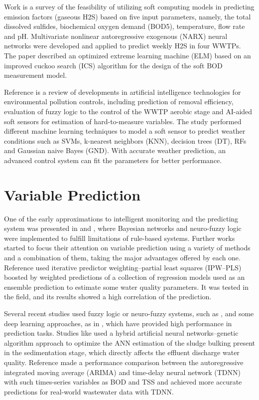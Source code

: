 Work \cite{Zounemat-Kermani2019} is a survey of the feasibility of utilizing soft computing models in predicting emission factors (gaseous H2S) based on five input parameters, namely, the total dissolved sulfides, biochemical oxygen demand (BOD5), temperature, flow rate and pH. Multivariate nonlinear autoregressive exogenous (NARX) neural networks were developed and applied to predict weekly H2S in four WWTPs. The paper \cite{Yu2019} described an optimized extreme learning machine (ELM) based on an improved cuckoo search (ICS) algorithm for the design of the soft BOD measurement model.

Reference \cite{Ye2020} is a review of developments in artificial intelligence technologies for environmental pollution controls, including prediction of removal efficiency, evaluation of fuzzy logic to the control of the WWTP aerobic stage and AI-aided soft sensors for estimation of hard-to-measure variables. 
The study \cite{Hernandez-del-Olmo2019} performed different machine learning techniques to model a soft sensor to predict weather conditions such as SVMs, k-nearest neighbors (KNN), decision trees (DT), RFs and Gaussian naive Bayes (GND). With accurate weather prediction, an advanced control system can fit the parameters for better performance.

\section{Variable Prediction}
\label{s:RelatedWorks-variablePrediction}

One of the early approximations to intelligent monitoring and the predicting system was presented in \cite{Sanguesa2000} and \cite{Haggege2005}, where Bayesian networks and neuro-fuzzy logic were implemented to fulfill limitations of rule-based systems. Further works started to focus their attention on variable prediction using a variety of methods and a combination of them, taking the major advantages offered by each one. Reference \cite{Qin2012} used iterative predictor weighting–partial least squares (IPW–PLS) boosted by weighted predictions of a collection of regression models used as an ensemble prediction to estimate some water quality parameters. It was tested in the field, and its results showed a high correlation of the prediction. 

Several recent studies used fuzzy logic or neuro-fuzzy systems, such as \cite{Nourani2018,Nadiri2018,Han2018}, and some deep learning approaches, as in \cite{Guo2015,Alsina2018,Dairi2019}, which have provided high performance in prediction tasks. Studies like \cite{Bagheri2015} used a hybrid artificial neural networks–genetic algorithm approach to optimize the ANN estimation of the sludge bulking present in the sedimentation stage, which directly affects the effluent discharge water quality. Reference \cite{Dellana2009} made a performance comparison between the autoregressive integrated moving average (ARIMA) and time-delay neural network (TDNN) with such times-series variables as BOD and TSS and achieved more accurate predictions for real-world wastewater data with TDNN.

